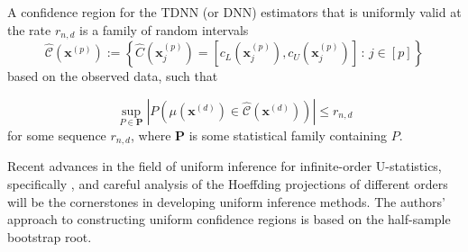 \documentclass[letterpaper,10pt]{article}
\numberwithin{equation}{section}
\numberwithin{theorem}{section}
\theoremstyle{definition}
\renewcommand{\hat}{\widehat}
\newcommand{\1}{\mathbb{1}}
\begin{document}
\vspace{0.5cm}
\begin{definition}
	A confidence region for the TDNN (or DNN) estimators that is uniformly valid at the rate $r_{n,d}$ is a family of random intervals
	\begin{equation}
		\hat{\mathcal{C}}\left(\mathbf{x}^{(p)}\right)
		:= \left\{\hat{C}(\mathbf{x}^{(p)}_{j}) = \left[c_{L}(\mathbf{x}^{(p)}_{j}), c_{U}(\mathbf{x}^{(p)}_{j})\right]\, : \, j \in [p]\right\}
	\end{equation}
	based on the observed data, such that

	\begin{equation}
		\sup_{P \in \mathbf{P}} \left| P\left(\mu(\mathbf{x}^{(d)}) \in \hat{\mathcal{C}}\left(\mathbf{x}^{(d)}\right)\right) \right| \leq r_{n,d}
	\end{equation}
	for some sequence $r_{n,d}$, where $\mathbf{P}$ is some statistical family containing $P$.
\end{definition}

Recent advances in the field of uniform inference for infinite-order U-statistics, specifically \citet{ritzwoller_uniform_2024}, and careful analysis of the Hoeffding projections of different orders will be the cornerstones in developing uniform inference methods.
The authors' approach to constructing uniform confidence regions is based on the half-sample bootstrap root.
\end{document}
